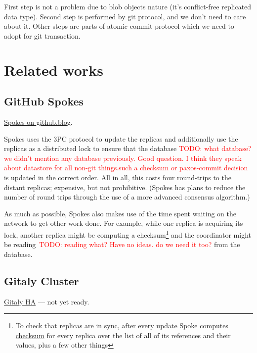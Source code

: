\documentclass[sigplan, screen, nonacm, 11pt]{acmart}
\newcommand{\todo}[1]{\textcolor{red}{TODO: #1}}
\begin{document}
First step is not a problem due to blob objects nature (it's conflict-free replicated data type).
Second step is performed by git protocol, and we don't need to care about it.
Other steps are parts of atomic-commit protocol which we need to adopt for git transaction.

\section{Related works}

\subsection{GitHub Spokes}

\href{https://github.blog/2017-10-13-stretching-spokes/}{Spokes on github.blog}.

Spokes uses the 3PC protocol to update the replicas and additionally use the replicas as a distributed lock
to ensure that the database \todo{what database? we didn't mention any database previously. Good question. I think they speak about datastore for all non-git things.such a checksum or paxos-commit decision} is updated in the correct order.
All in all, this costs four round-trips to the distant replicas;
expensive, but not prohibitive.
(Spokes has plans to reduce the number of round trips through the use of a more advanced consensus algorithm.)

As much as possible, Spokes also makes use of the time spent waiting on the network to get other work done.
For example, while one replica is acquiring its lock,
another replica might be computing a checksum\footnote{To check that replicas are in sync, after every update Spoke computes \href{https://github.blog/2017-10-13-stretching-spokes/\#using-checksums-to-compare-replicas}{checksum} for every replica over the list of all of its references and their values, plus a few other things}
and the coordinator might be reading~\todo{reading what? Have no ideas. do we need it too?} from the database.





\subsection{Gitaly Cluster}

\href{https://gitlab.com/groups/gitlab-org/-/epics/1189}{Gitaly HA} --- not yet ready.
\end{document}
